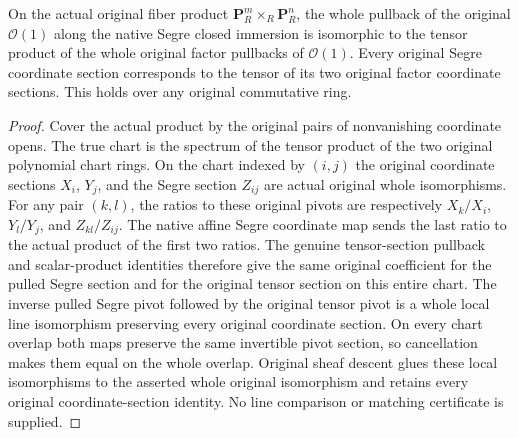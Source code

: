 \begin{theorem}
\label{thm:fc-original-segre-projective-twist}
\leanok
{}
On the actual original fiber product $\mathbf P^m_R\times_R\mathbf P^n_R$,
the whole pullback of the original $\mathcal O(1)$ along the native
Segre closed immersion is isomorphic to the tensor product of the whole
original factor pullbacks of $\mathcal O(1)$. Every original Segre
coordinate section corresponds to the tensor of its two original factor
coordinate sections. This holds over any original commutative ring.
\end{theorem}
\begin{proof}
Cover the actual product by the original pairs of nonvanishing
coordinate opens. The true chart is the spectrum of the tensor product
of the two original polynomial chart rings. On the chart indexed by
$(i,j)$ the original coordinate sections $X_i$, $Y_j$, and the Segre
section $Z_{ij}$ are actual original whole isomorphisms. For any pair
$(k,l)$, the ratios to these original pivots are respectively
$X_k/X_i$, $Y_l/Y_j$, and $Z_{kl}/Z_{ij}$. The native affine Segre
coordinate map sends the last ratio to the actual product of the first
two ratios. The genuine tensor-section pullback and scalar-product
identities therefore give the same original coefficient for the pulled
Segre section and for the original tensor section on this entire chart.
The inverse pulled Segre pivot followed by the original tensor pivot
is a whole local line isomorphism preserving every original coordinate
section. On every chart overlap both maps preserve the same invertible
pivot section, so cancellation makes them equal on the whole overlap.
Original sheaf descent glues these local isomorphisms to the asserted
whole original isomorphism and retains every original coordinate-section
identity. No line comparison or matching certificate is supplied.
\end{proof}
